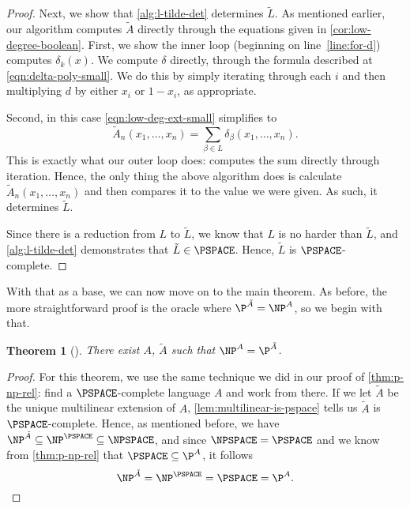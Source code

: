 \documentclass[english,12pt]{reedthesis}
\theoremstyle{plain}
\newtheorem{thm}{Theorem}[section]
\theoremstyle{definition}
\theoremstyle{remark}
\begin{document}
\begin{proof}
  Next, we show that \cref{alg:l-tilde-det} determines $\tilde{L}$. As mentioned
  earlier, our algorithm computes $\tilde{A}$ directly through the equations
  given in \cref{cor:low-degree-boolean}. First, we show the inner loop
  (beginning on line~\ref{line:for-d}) computes $\delta_{k}(x)$. We compute $\delta$
  directly, through the formula described at \cref{eqn:delta-poly-small}. We do
  this by simply iterating through each $i$ and then multiplying $d$ by either
  $x_{i}$ or $1-x_{i}$, as appropriate.

  Second, in this case \cref{eqn:low-deg-ext-small} simplifies to
  \begin{equation}
    \tilde{A}_{n}(x_{1}, \ldots, x_{n}) = \sum_{\beta \in L}\delta_{\beta}(x_{1}, \ldots, x_{n}).
  \end{equation}
  This is exactly what our outer loop does: computes the sum directly through
  iteration.
  Hence, the only thing the above algorithm does is calculate
  $\tilde{A}_{n}(x_{1}, \ldots, x_{n})$ and then compares it to the value we were
  given. As such, it determines $\tilde{L}$.

  Since there is a reduction from $L$ to $\tilde{L}$, we know that $L$ is no
  harder than $\tilde{L}$, and \cref{alg:l-tilde-det} demonstrates that
  $\tilde{L} \in \PSPACE$. Hence, $\tilde{L}$ is $\PSPACE$-complete.
\end{proof}

With that as a base, we can now move on to the main theorem. As before, the more
straightforward proof is the oracle where $\P^{\tilde{A}} = \NP^{A}$, so we
begin with that.

\begin{thm}[{\cite[Theorem 5.1]{AW09}}]\label{thm:p-np-alg}
  There exist $A$, $\tilde{A}$ such that $\NP^{A} = \P^{\tilde{A}}$.
\end{thm}

\begin{proof}
  For this theorem, we use the same technique we did in our proof of
  \cref{thm:p-np-rel}: find a $\PSPACE$-complete language $A$ and work from
  there. If we let $\tilde{A}$ be the unique multilinear extension of $A$,
  \cref{lem:multilinear-is-pspace} tells us $\tilde{A}$ is $\PSPACE$-complete.
  Hence, as mentioned before, we have
  $\NP^{\tilde{A}} \subseteq \NP^{\PSPACE} \subseteq \NPSPACE$, and since $\NPSPACE = \PSPACE$
  and we know from \cref{thm:p-np-rel} that $\PSPACE \subseteq \P^{A}$, it follows
  \begin{equation*}
    \NP^{\tilde{A}} = \NP^{\PSPACE} = \PSPACE = \P^{A}.
  \end{equation*}
\end{proof}
\end{document}

